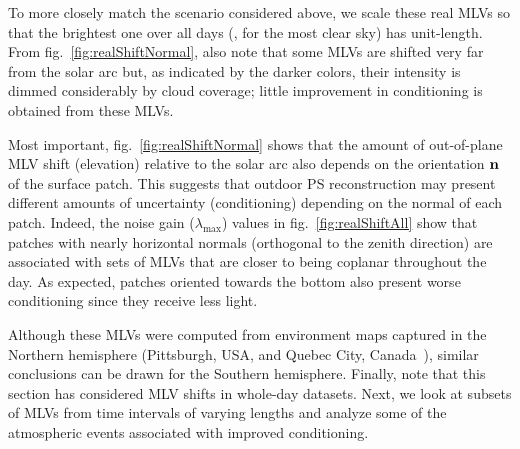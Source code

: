 To more closely match the scenario considered above, we scale these real MLVs so that the brightest one over all days (\ie, for the most clear sky) has unit-length. From fig.~\ref{fig:realShiftNormal}, also note that some MLVs are shifted very far from the solar arc but, as indicated by the darker colors, their intensity is dimmed considerably by cloud coverage; little improvement in conditioning is obtained from these MLVs. 

Most important, fig.~\ref{fig:realShiftNormal} shows that the amount of out-of-plane MLV shift (elevation) relative to the solar arc also depends on the orientation ${\bf n}$ of the surface patch. This suggests that outdoor PS reconstruction may present different amounts of uncertainty (conditioning) depending on the normal of each patch. Indeed, the noise gain ($\lambda_{\max}$) values in fig.~\ref{fig:realShiftAll} show that patches with nearly horizontal normals (orthogonal to the zenith direction) are associated with sets of MLVs that are closer to being coplanar throughout the day. As expected, patches oriented towards the bottom also present worse conditioning since they receive less light. 


Although these MLVs were computed from environment maps captured in the Northern hemisphere (Pittsburgh, USA, and Quebec City, Canada~\cite{holdgeoffroy-iccp-15}), similar conclusions can be drawn for the Southern hemisphere. Finally, note that this section has considered MLV shifts in whole-day datasets. Next, we look at subsets of MLVs from time intervals of varying lengths and analyze some of the atmospheric events associated with improved conditioning. 



